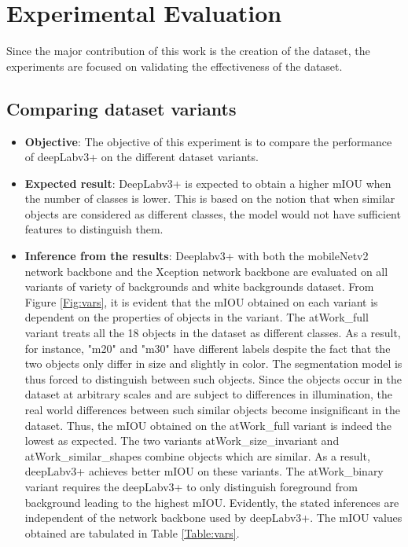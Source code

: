 
\chapter{Experimental Evaluation}

Since the major contribution of this work is the creation of the dataset, the experiments are focused on validating the effectiveness of the dataset. 


\section{Comparing dataset variants} 

	\begin{itemize}
		\item \textbf{Objective}: The objective of this experiment is to compare the performance of deepLabv3+ on the different dataset variants.
		\item \textbf{Expected result}: DeepLabv3+ is expected to obtain a higher mIOU when the number of classes is lower. This is based on the notion that when similar objects are considered as different classes, the model would not have sufficient features to distinguish them.
		\item \textbf{Inference from the results}: Deeplabv3+ with both the mobileNetv2 network backbone and the Xception network backbone are evaluated on all variants of variety of backgrounds and white backgrounds dataset. From Figure \ref{Fig:vars}, it is evident that the mIOU obtained on each variant is dependent on the properties of objects in the variant. The atWork\_full variant treats all the 18 objects in the dataset as different classes. As a result, for instance, "m20" and "m30" have different labels despite the fact that the two objects only differ in size and slightly in color. The segmentation model is thus forced to distinguish between such objects. Since the objects occur in the dataset at arbitrary scales and are subject to differences in illumination, the real world differences between such similar objects become insignificant in the dataset. Thus, the mIOU obtained on the atWork\_full variant is indeed the lowest as expected. The two variants atWork\_size\_invariant and atWork\_similar\_shapes combine objects which are similar. As a result, deepLabv3+ achieves better mIOU on these variants. The atWork\_binary variant requires the deepLabv3+ to only distinguish foreground from background leading to the highest mIOU. Evidently, the stated inferences are independent of the network backbone used by deepLabv3+. The mIOU values obtained are tabulated in Table \ref{Table:vars}.
	\end{itemize}
	

